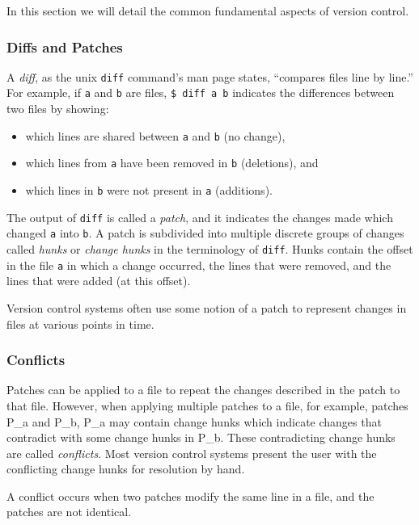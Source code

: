 \documentclass[]{article}
\begin{document}
In this section we will detail the common fundamental aspects of version
control.

\subsubsection{Diffs and Patches}

A \emph{diff}, as the unix \texttt{diff} command's man page states,
``compares files line by line.'' For example, if \texttt{a} and
\texttt{b} are files, \texttt{\$ diff a b} indicates the differences
between two files by showing:

\begin{itemize}
\item
  which lines are shared between \texttt{a} and \texttt{b} (no change),
\item
  which lines from \texttt{a} have been removed in \texttt{b}
  (deletions), and
\item
  which lines in \texttt{b} were not present in \texttt{a} (additions).
\end{itemize}

The output of \texttt{diff} is called a \emph{patch}, and it indicates
the changes made which changed \texttt{a} into \texttt{b}. A patch is
subdivided into multiple discrete groups of changes called \emph{hunks}
or \emph{change hunks} in the terminology of \texttt{diff}. Hunks
contain the offset in the file \texttt{a} in which a change occurred,
the lines that were removed, and the lines that were added (at this
offset).

Version control systems often use some notion of a patch to represent
changes in files at various points in time.

\subsubsection{Conflicts}

Patches can be applied to a file to repeat the changes described in the
patch to that file. However, when applying multiple patches to a file,
for example, patches P\_a and P\_b, P\_a may contain change hunks which
indicate changes that contradict with some change hunks in P\_b. These
contradicting change hunks are called \emph{conflicts}. Most version
control systems present the user with the conflicting change hunks for
resolution by hand.

A conflict occurs when two patches modify the same line in a file, and
the patches are not identical.
\end{document}
